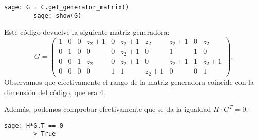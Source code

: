 \begin{exampleth}
    \begin{lstlisting}[gobble=4]
        sage: G = C.get_generator_matrix()
        sage: show(G)
    \end{lstlisting}

    Este código devuelve la siguiente matriz generadora:
    \[
        G = \left(\begin{array}{rrrrrrrrrr}
        1 & 0 & 0 & z_{2} + 1 & 0 & z_{2} + 1 & z_{2} & z_{2} + 1 & 0 & z_{2} \\
        0 & 1 & 0 & 0 & 0 & z_{2} + 1 & 0 & 1 & 1 & 0 \\
        0 & 0 & 1 & z_{2} & 0 & z_{2} + 1 & 0 & z_{2} + 1 & 1 & z_{2} + 1 \\
        0 & 0 & 0 & 0 & 1 & 1 & z_{2} + 1 & 0 & 0 & 1
        \end{array}\right).
    \]
    Observamos que efectivamente el rango de la matriz generadora coincide con la dimensión del código, que era $4$.

    Además, podemos comprobar efectivamente que se da la igualdad $H \cdot G^T = 0$:

    \begin{lstlisting}[gobble=4]
        sage: H*G.T == 0
        > True
    \end{lstlisting}
\end{exampleth}

